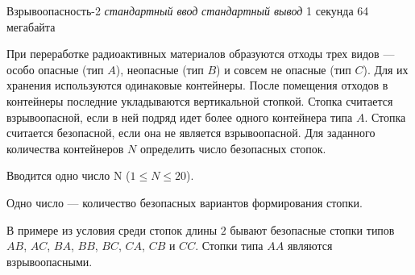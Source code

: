 \begin{problem}%
{Взрывоопасность-2}%
{\textsl{стандартный ввод}}%
{\textsl{стандартный вывод}}%
{1 секунда}%
{64 мегабайта}{}

При переработке радиоактивных материалов образуются отходы трех видов — особо опасные (тип $A$), неопасные (тип $B$) и совсем не опасные (тип $C$). Для их хранения используются одинаковые контейнеры. После помещения отходов в контейнеры последние укладываются вертикальной стопкой. Стопка считается взрывоопасной, если в ней подряд идет более одного контейнера типа $A$. Стопка считается безопасной, если она не является взрывоопасной. Для заданного количества контейнеров $N$ определить число безопасных стопок.

\InputFile

Вводится одно число N ($1 \le N \le 20$).

\OutputFile

Одно число — количество безопасных вариантов формирования стопки.

\Examples

\begin{example}
%
\end{example}

\Explanation

В примере из условия среди стопок длины $2$ бывают безопасные стопки типов $AB$, $AC$, $BA$, $BB$, $BC$, $CA$, $CB$ и $CC$. Стопки типа $AA$ являются взрывоопасными.

\end{problem}